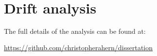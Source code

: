    
\chapter{Drift analysis}

The full details of the analysis can be found at:

 \url{https://github.com/christopherahern/dissertation}